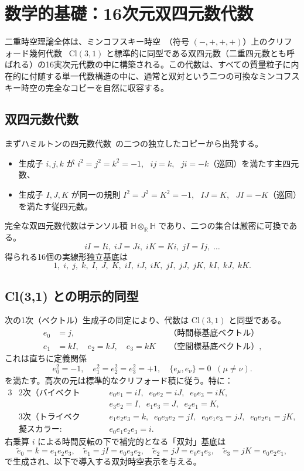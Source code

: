 \documentclass[a4paper]{article}
\begin{document}
\section{数学的基礎：16次元双四元数代数}
\label{sec:math}

二重時空理論全体は、ミンコフスキー時空~\cite{minkowski1909}（符号 $(-,+,+,+)$）上のクリフォード幾何代数~\cite{clifford1878} $\mathrm{Cl}(3,1)$ と標準的に同型である双四元数（二重四元数とも呼ばれる）の16実次元代数の中に構築される。この代数は、すべての質量粒子に内在的に付随する単一代数構造の中に、通常と双対という二つの可換なミンコフスキー時空の完全なコピーを自然に収容する。

\subsection{双四元数代数}

まずハミルトンの四元数代数~\cite{hamilton1844}の二つの独立したコピーから出発する。
\begin{itemize}
  \item 生成子 $i,j,k$ が $i^2=j^2=k^2=-1$, \ $ij=k$, \ $ji=-k$（巡回）を満たす主四元数、
  \item 生成子 $I,J,K$ が同一の規則 $I^2=J^2=K^2=-1$, \ $IJ=K$, \ $JI=-K$（巡回）を満たす従四元数。
\end{itemize}
完全な双四元数代数はテンソル積 $\mathbb{H} \otimes_{\mathbb{R}} \mathbb{H}$ であり、二つの集合は厳密に可換である。
\[
iI = Ii,\; iJ = Ji,\; iK = Ki,\; jI = Ij,\; \dots
\]
得られる16個の実線形独立基底は
\[
1,\; i,\; j,\; k,\; I,\; J,\; K,\; iI,\; iJ,\; iK,\; jI,\; jJ,\; jK,\; kI,\; kJ,\; kK.
\]

\subsection{Cl(3,1) との明示的同型}

次の1次（ベクトル）生成子の同定により、代数は $\mathrm{Cl}(3,1)$ と同型である。
\begin{align*}
  e_0 &= j,                    & &\text{（時間様基底ベクトル）}\\[4pt]
  e_1 &= kI, \quad e_2 = kJ, \quad e_3 = kK & &\text{（空間様基底ベクトル）},
\end{align*}
これは直ちに定義関係
\[
e_0^2 = -1, \quad e_1^2 = e_2^2 = e_3^2 = +1, \quad \{e_\mu,e_\nu\} = 0 \;\; (\mu \neq \nu).
\]
を満たす。高次の元は標準的なクリフォード積に従う。特に：
\begin{alignat*}{3}
  &\text{2次（バイベクトル）:}  &\quad& e_0e_1 = iI, \;\; e_0e_2 = iJ, \;\; e_0e_3 = iK, \\
  &&& e_3e_2 = I,   \;\; e_1e_3 = J,   \;\; e_2e_1 = K, \\[6pt]
  &\text{3次（トライベクトル）:} && e_1e_2e_3 = k, \;\; e_0e_3e_2 = jI, \;\; e_0e_1e_3 = jJ, \;\; e_0e_2e_1 = jK, \\[6pt]
  &\text{擬スカラー:}        && e_0e_1e_2e_3 = i.
\end{alignat*}
右乗算 $i$ による時間反転の下で補完的となる「双対」基底は
\[
\tilde{e}_0 = k = e_1e_2e_3, \quad \tilde{e}_1 = jI = e_0e_3e_2, \quad \tilde{e}_2 = jJ = e_0e_1e_3, \quad \tilde{e}_3 = jK = e_0e_2e_1,
\]
で生成され、以下で導入する双対時空表示を与える。
\end{document}
